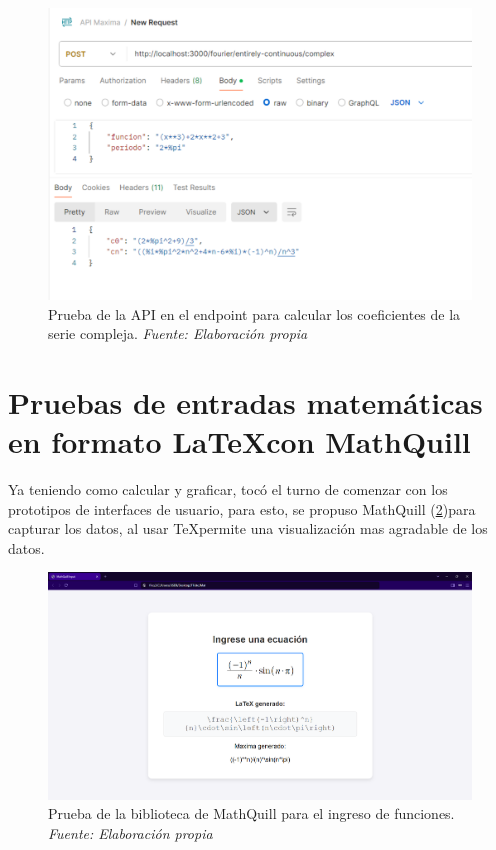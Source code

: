 \begin{figure}[H]
	\centering
	\includegraphics[width=1\textwidth]{img/chapter06/postman_complex.png}
	\caption[Prueba de la API en el endpoint para calcular los coeficientes de la serie compleja.]{Prueba de la API en el endpoint para calcular los coeficientes de la serie compleja. \textit{Fuente: Elaboración propia}}
	\label{fig:postman_complex}
\end{figure}


\section{Pruebas de entradas matemáticas en formato \LaTeX con MathQuill}
Ya teniendo como calcular y graficar, tocó el turno de comenzar con los prototipos de interfaces de usuario, para esto, se propuso MathQuill (\ref{fig:prueba_mathquill})para capturar los datos, al usar \TeX permite una visualización mas agradable de los datos.

\begin{figure}[H]
	\centering
	\includegraphics[width=1\textwidth]{img/chapter06/prueba_mathquill.png}
	\caption[Prueba de la biblioteca de MathQuill para el ingreso de funciones.]{Prueba de la biblioteca de MathQuill para el ingreso de funciones. \textit{Fuente: Elaboración propia}}
	\label{fig:prueba_mathquill}
\end{figure}


